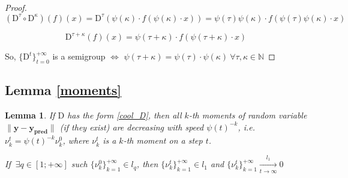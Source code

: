 \documentclass{article}
\newtheorem*{lemma-non}{Lemma}
\begin{document}
    \begin{proof}
        \begin{equation*}
            (\text{D}^{\tau} \circ \text{D}^{\kappa})(f)(x) = \text{D}^{\tau}(\psi(\kappa) \cdot f(\psi(\kappa) \cdot x)) = \psi(\tau)\psi(\kappa) \cdot f(\psi(\tau)\psi(\kappa) \cdot x)
        \end{equation*}
            
        \begin{equation*}
            \text{D}^{\tau + \kappa}(f)(x) = \psi(\tau + \kappa) \cdot f(\psi(\tau + \kappa) \cdot x)
        \end{equation*}
        
        So, $\{\text{D}^t\}_{t=0}^{+\infty}$ is a semigroup $\Leftrightarrow$ $\psi(\tau + \kappa) = \psi(\tau) \cdot \psi(\kappa) ~\forall \tau, \kappa \in \mathbb{N}$
    \end{proof}

    \subsection{Lemma \ref{moments}} \label{pr_moments}
    \begin{lemma-non}
        If $\text{D}$ has the form \eqref{cool_D}, then all $k$-th moments of random variable $\|\mathbf{y} - \mathbf{y_{\text{pred}}}\|$ (if they exist) are decreasing with speed $\psi(t)^{-k}$, i.e. $\nu_k^t = \psi(t)^{-k} \nu_k^0$, where $\nu_k^t$ is a $k$-th moment on a step $t$.

        If $~\exists q \in [1; +\infty]$ such $\{\nu_k^0\}_{k=1}^{+\infty} \in l_q$, then $\{\nu_k^t\}_{k=1}^{+\infty} \in l_1$ and $\{\nu_k^t\}_{k=1}^{+\infty} \underset{t \to \infty}{\overset{l_1}{\longrightarrow}} 0$
    \end{lemma-non}
\end{document}
